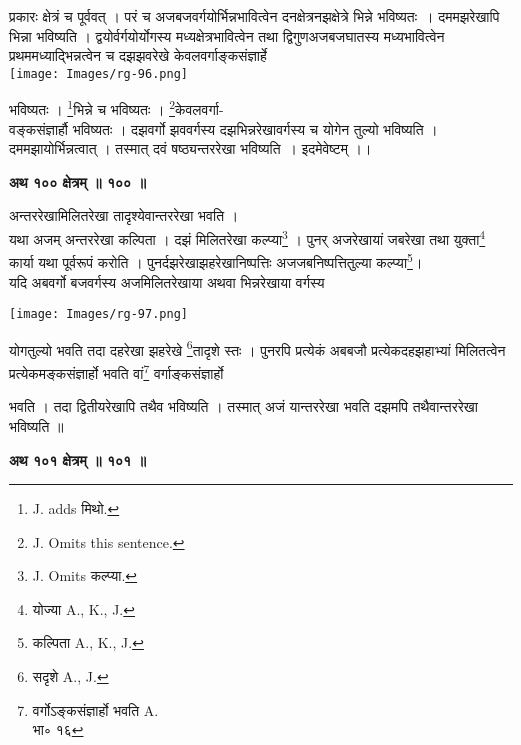 \documentclass[11pt, openany]{book}
\begin{document}
\begin{vwcol}[widths={0.65,0.35}, sep=.8cm, rule=0pt]
 प्रकारः क्षेत्रं च पूर्ववत् । परं च अजबजवर्गयोर्भिन्नभावित्वेन
दनक्षेत्रनझक्षेत्रे भिन्ने भविष्यतः~। दममझरेखापि भिन्ना  भविष्यति । द्वयोर्वर्गयोर्योगस्य मध्यक्षेत्रभावित्वेन तथा द्विगुणअजबजघातस्य मध्यभावित्वेन प्रथममध्याद्भिन्नत्वेन च दझझवरेखे केवलवर्गाङ्कसंज्ञार्हे\\
\noindent \texttt{[image: Images/rg-96.png]}
\end{vwcol}
\vspace{-7mm}

\noindent  भविष्यतः । \renewcommand{\thefootnote}{१}\footnote{{\en  J. adds} मिथो.}भिन्ने च भविष्यतः । \renewcommand{\thefootnote}{२}\footnote{{\en J. Omits this sentence.} }केवलवर्गा-\\वङ्कसंज्ञार्हौ 
भविष्यतः । दझवर्गो झववर्गस्य दझभिन्नरेखावर्गस्य च योगेन तुल्यो भविष्यति ।
दममझायोर्भिन्नत्वात् । तस्मात् दवं षष्ठ्यन्तररेखा भविष्यति~। इदमेवेष्टम् ।। \\
\begin{center}
\textbf{अथ १०० क्षेत्रम् ॥ १०० ॥}
\end{center}
\vspace{3mm}

{\ab अन्तररेखामिलितरेखा तादृश्येवान्तररेखा भवति । }\\

 यथा अजम् अन्तररेखा कल्पिता । दझं मिलितरेखा कल्प्या\renewcommand{\thefootnote}{३}\footnote{{\en J. Omits} कल्प्या. } ।
पुनर् अजरेखायां जबरेखा तथा युक्ता\renewcommand{\thefootnote}{४}\footnote{योज्या {\en A., K., J.} } कार्या यथा पूर्वरूपं करोति ।
पुनर्दझरेखाझहरेखानिष्पत्तिः अजजबनिष्पत्तितुल्या कल्प्या\renewcommand{\thefootnote}{५}\footnote{कल्पिता {\en A., K., J.} }। \\

यदि अबवर्गो बजवर्गस्य अजमिलितरेखाया अथवा भिन्नरेखाया वर्गस्य
\begin{center}
\texttt{[image: Images/rg-97.png]}
\end{center}
योगतुल्यो भवति तदा दहरेखा झहरेखे \renewcommand{\thefootnote}{६}\footnote{सदृशे {\en A., J.}}तादृशे स्तः ।  पुनरपि प्रत्येकं
अबबजौ प्रत्येकदहझहाभ्यां मिलितत्वेन प्रत्येकमङ्कसंज्ञार्हो भवति वां\renewcommand{\thefootnote}{७}\footnote{वर्गोऽङ्कसंज्ञार्हो भवति {\en A.}\\
भा∘ १६} वर्गाङ्कसंज्ञार्हो 

\newpage
\noindent भवति । तदा द्वितीयरेखापि तथैव भविष्यति । तस्मात् अजं यान्तररेखा भवति दझमपि तथैवान्तररेखा भविष्यति ॥ \\
\begin{center}
\textbf{\large अथ १०१ क्षेत्रम् ॥ १०१ ॥}
\end{center}
\vspace{5mm}
\end{document}
